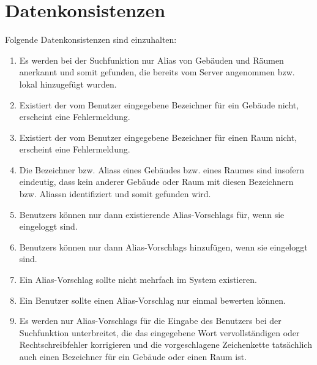\section{Datenkonsistenzen}

Folgende Datenkonsistenzen sind einzuhalten:
\begin{enumerate}[label=\textbf{/T\arabic*0/}, align=left, resume]
	\item Es werden bei der Suchfunktion nur \Gls{Alias} von Gebäuden und Räumen anerkannt und somit gefunden, die bereits vom \Gls{Server} angenommen bzw. \gls{lokal} hinzugefügt wurden.
	\item Existiert der vom \Gls{Benutzer} eingegebene Bezeichner für ein Gebäude nicht, erscheint eine Fehlermeldung.
	\item Existiert der vom \Gls{Benutzer} eingegebene Bezeichner für einen Raum nicht, erscheint eine Fehlermeldung.
	\item Die Bezeichner bzw. \Glspl{Alias} eines Gebäudes bzw. eines Raumes sind insofern eindeutig, dass kein anderer Gebäude oder Raum mit diesen Bezeichnern bzw. \Glspl{Alias}n identifiziert und somit gefunden wird.
	\item \Glspl{Benutzer} können nur dann existierende \Glspl{Alias-Vorschlag} für, wenn sie eingeloggt sind.
	\item \Glspl{Benutzer} können nur dann \Glspl{Alias-Vorschlag} hinzufügen, wenn sie eingeloggt sind.
	\item Ein \Gls{Alias-Vorschlag} sollte nicht mehrfach im System existieren.
	\item Ein \Gls{Benutzer} sollte einen \Gls{Alias-Vorschlag} nur einmal bewerten können.
	\item Es werden nur \Glspl{Alias-Vorschlag} für die Eingabe des \Gls{Benutzer}s bei der Suchfunktion unterbreitet, die das eingegebene Wort vervollständigen oder Rechtschreibfehler korrigieren und die vorgeschlagene Zeichenkette tatsächlich auch einen Bezeichner für ein Gebäude oder einen Raum ist.
\end{enumerate}